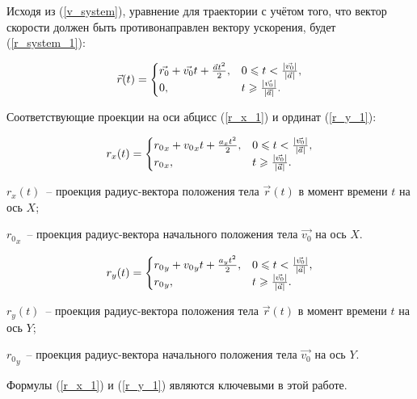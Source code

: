 Исходя из (\ref{v_system}), уравнение для траектории с учётом того, что вектор скорости должен быть
противонаправлен вектору ускорения, будет (\ref{r_system_1}):

\begin{equation}\label{r_system_1}
  \vec{r}(t) = \begin{cases}
    \vec{r_0} + \vec{v_0}t + \frac{\vec{a}t^2}{2}, & 0 \leqslant t < \frac{\left|\vec{v_0}\right|}{\left|\vec{a}\right|}, \\
    0,                                             & t \geqslant \frac{\left|\vec{v_0}\right|}{\left|\vec{a}\right|} .
  \end{cases}
\end{equation}

Соответствующие проекции на оси абцисс (\ref{r_x_1}) и ординат (\ref{r_y_1}):

\begin{equation}\label{r_x_1}
  r_x(t) =
  \begin{cases}
    {r_0}_x + {v_0}_x t + \frac{a_x t^2}{2}, & 0 \leqslant t < \frac{\left|\vec{v_0}\right|}{\left|\vec{a}\right|}, \\
    {r_0}_x,               & t \geqslant \frac{\left|\vec{v_0}\right|}{\left|\vec{a}\right|}.
  \end{cases}
\end{equation}

\begin{Underequation}
  \(r_x(t)\)~-- проекция радиус-вектора положения тела \(\vec{r}(t)\) в момент времени \(t\) на ось \(X\); 

  \({r_0}_x\)~-- проекция радиус-вектора начального положения тела \(\vec{v_0}\) на ось \(X\). 
\end{Underequation}

\begin{equation}\label{r_y_1}
  r_y(t) =
  \begin{cases}
    {r_0}_y + {v_0}_y t + \frac{a_y t^2}{2}, & 0 \leqslant t < \frac{\left|\vec{v_0}\right|}{\left|\vec{a}\right|}, \\
    {r_0}_y,               & t \geqslant \frac{\left|\vec{v_0}\right|}{\left|\vec{a}\right|}.
  \end{cases}
\end{equation}

\begin{Underequation}
  \(r_y(t)\)~-- проекция радиус-вектора положения тела \(\vec{r}(t)\) в момент времени \(t\) на ось \(Y\); 

  \({r_0}_y\)~-- проекция радиус-вектора начального положения тела \(\vec{v_0}\) на ось \(Y\). 
\end{Underequation}

Формулы (\ref{r_x_1}) и (\ref{r_y_1}) являются ключевыми в этой работе.
